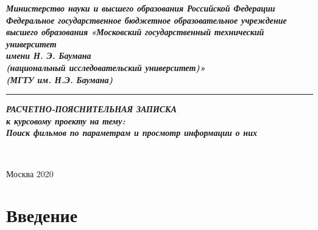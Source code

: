 \documentclass[12pt]{article}
\begin{document}
\begin{center}
	\hfill \break
	\textit{
		\normalsize {\bf  Министерство науки и высшего образования Российской Федерации}\\
		\normalsize {\bf Федеральное государственное бюджетное образовательное учреждение }\\
		\normalsize {\bf  высшего  образования}
		\normalsize  {\bf  «Московский государственный технический университет}\\ 
		\normalsize  {\bf имени Н. Э. Баумана}\\
		\normalsize  {\bf (национальный исследовательский университет)»}\\
		\normalsize  {\bf (МГТУ им. Н.Э. Баумана)}\\
	}
	\noindent\rule{\textwidth}{2pt}
	\hfill \break
	\hfill\break
	\hfill\break
	\hfill\break
	\hfill\break
	\hfill\break
	\hfill\break
	\hfill \break
	\hfill \break
	\textit{
		\normalsize {\bf РАСЧЕТНО-ПОЯСНИТЕЛЬНАЯ ЗАПИСКА}\\
		\normalsize {\bf к курсовому проекту на тему:}\\
		\normalsize {\bf  Поиск фильмов по параметрам и просмотр информации о них} \\
	}
	\hfill \break
	\hfill \break
	\hfill \break
	\hfill \break
	\hfill \break
	\hfill \break
	\hfill \break
	\hfill \break
	\hfill \break
	\hfill \break
	\hfill \break
	
	\hfill \break
	\normalsize {
		\noindent
		\makebox[\textwidth][c]{}%
	}\\
	\hfill \break
	\hfill \break
	\normalsize {
		\noindent
		\makebox[\textwidth][c]{}%
	}
	\hfill \break
	\hfill \break
	\hfill \break
	\hfill \break\hfill \break
	\hfill \break
\end{center}
\hfill \break
\hfill \break
\begin{center} Москва 2020\end{center}

\thispagestyle{empty} 
\tableofcontents
\newpage
\section*{Введение}
\end{document}
